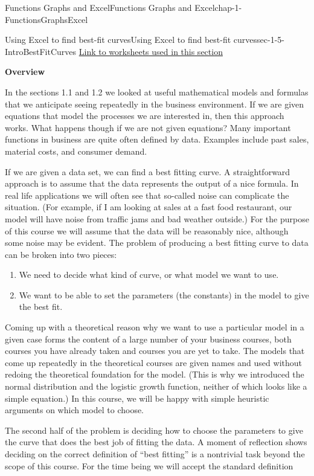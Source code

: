 \documentclass[oneside,10pt,]{book}
\newcommand{\terminology}[1]{\textbf{#1}}
\numberwithin{equation}{section}
\begin{document}
\begin{chapterptx}{Functions Graphs and Excel}{}{Functions Graphs and Excel}{}{}{chap-1-FunctionsGraphsExcel}
\begin{sectionptx}{Using Excel to find best-fit curves}{}{Using Excel to find best-fit curves}{}{}{sec-1-5-IntroBestFitCurves}
\href{./Examples/Section-1-5-Examples.xlsx}{Link to worksheets used in this section}%
\par
\hypertarget{p-361}{}%
\terminology{Overview}%
\par
\hypertarget{p-362}{}%
In the sections 1.1 and 1.2 we looked at useful mathematical models and formulas that we anticipate seeing repeatedly in the business environment.  If we are given equations that model the processes we are interested in, then this approach works. What happens though if we are not given equations? Many important functions in business are quite often defined by data.  Examples include past sales, material costs, and consumer demand.%
\par
\hypertarget{p-363}{}%
If we are given a data set, we can find a best fitting curve.  A straightforward approach is to assume that the data represents the output of a nice formula. In real life applications we will often see that so-called noise can complicate the situation.  (For example, if I am looking at sales at a fast food restaurant, our model will have noise from traffic jams and bad weather outside.) For the purpose of this course we will assume that the data will be reasonably nice, although some noise may be evident. The problem of producing a best fitting curve to data can be broken into two pieces:%
\leavevmode%
\begin{enumerate}
\item\hypertarget{li-98}{}\hypertarget{p-364}{}%
We need to decide what kind of curve, or what model we want to use.%
\item\hypertarget{li-99}{}\hypertarget{p-365}{}%
We want to be able to set the parameters (the constants) in the model to give the best fit.%
\end{enumerate}
\hypertarget{p-366}{}%
Coming up with a theoretical reason why we want to use a particular model in a given case forms the content of a large number of your business courses, both courses you have already taken and courses you are yet to take.  The models that come up repeatedly in the theoretical courses are given names and used without redoing the theoretical foundation for the model.  (This is why we introduced the normal distribution and the logistic growth function, neither of which looks like a simple equation.)  In this course, we will be happy with simple heuristic arguments on which model to choose.%
\par
\hypertarget{p-367}{}%
The second half of the problem is deciding how to choose the parameters to give the curve that does the best job of fitting the data.  A moment of reflection shows deciding on the correct definition of “best fitting” is a nontrivial task beyond the scope of this course.  For the time being we will accept the standard definition%

\end{sectionptx}
\end{chapterptx}
\end{document}
